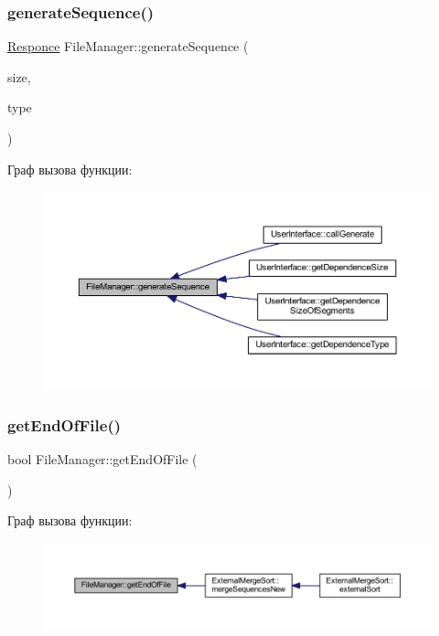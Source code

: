 \subsubsection{\texorpdfstring{generate\+Sequence()}{generateSequence()}}
{\footnotesize\ttfamily \hyperlink{_structures_8h_a9864d6ef28dd6e38416afac4426b3491}{Responce} File\+Manager\+::generate\+Sequence (\begin{DoxyParamCaption}\item[{long long}]{size,  }\item[{\hyperlink{_structures_8h_a76639e910448c3333d0f4d204e53c2c1}{Seq\+Type}}]{type }\end{DoxyParamCaption})}

Граф вызова функции\+:\nopagebreak
\begin{figure}[H]
\begin{center}
\leavevmode
\includegraphics[width=350pt]{class_file_manager_a654c8bf606626cd419f5828839cb21a1_icgraph}
\end{center}
\end{figure}
\hypertarget{class_file_manager_a49df99509ff2700e0e5edd06adca345c}{}\label{class_file_manager_a49df99509ff2700e0e5edd06adca345c} 
\subsubsection{\texorpdfstring{get\+End\+Of\+File()}{getEndOfFile()}}
{\footnotesize\ttfamily bool File\+Manager\+::get\+End\+Of\+File (\begin{DoxyParamCaption}{ }\end{DoxyParamCaption})}

Граф вызова функции\+:\nopagebreak
\begin{figure}[H]
\begin{center}
\leavevmode
\includegraphics[width=350pt]{class_file_manager_a49df99509ff2700e0e5edd06adca345c_icgraph}
\end{center}
\end{figure}
\hypertarget{class_file_manager_abd4cbc2b218ab1828ae376a4a9137057}{}\label{class_file_manager_abd4cbc2b218ab1828ae376a4a9137057} 
